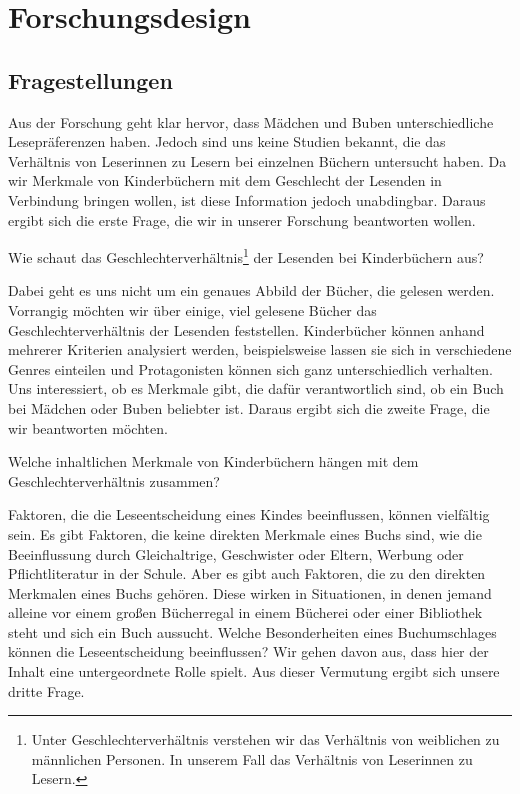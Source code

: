 \chapter{Forschungsdesign}

\section{Fragestellungen}

Aus der Forschung geht klar hervor, dass Mädchen und Buben
unterschiedliche Lesepräferenzen haben. Jedoch sind uns keine Studien
bekannt, die das Verhältnis von Leserinnen zu Lesern bei einzelnen
Büchern untersucht haben. Da wir Merkmale von Kinderbüchern mit dem
Geschlecht der Lesenden in Verbindung bringen wollen, ist diese
Information jedoch unabdingbar. Daraus ergibt sich die erste Frage, die
wir in unserer Forschung beantworten wollen.

\begin{frage}\label{fra:andere} Wie schaut das Geschlechterverhältnis\footnote{Unter Geschlechterverhältnis verstehen wir das Verhältnis von weiblichen zu männlichen Personen. In unserem Fall das Verhältnis von Leserinnen zu Lesern.} der Lesenden bei Kinderbüchern aus? \end{frage}

Dabei geht es uns nicht um ein genaues Abbild der Bücher, die gelesen
werden. Vorrangig möchten wir über einige, viel gelesene Bücher das
Geschlechterverhältnis der Lesenden feststellen. Kinderbücher können
anhand mehrerer Kriterien analysiert werden, beispielsweise lassen sie
sich in verschiedene Genres einteilen und Protagonisten können sich ganz
unterschiedlich verhalten. Uns interessiert, ob es Merkmale gibt, die
dafür verantwortlich sind, ob ein Buch bei Mädchen oder Buben beliebter
ist. Daraus ergibt sich die zweite Frage, die wir beantworten möchten.

\begin{frage}\label{fra:unterschiede} Welche inhaltlichen Merkmale von Kinderbüchern hängen mit dem Geschlechterverhältnis zusammen? \end{frage}

Faktoren, die die Leseentscheidung eines Kindes beeinflussen, können
vielfältig sein. Es gibt Faktoren, die keine direkten Merkmale eines
Buchs sind, wie \zB die Beeinflussung durch Gleichaltrige, Geschwister
oder Eltern, Werbung oder Pflichtliteratur in der Schule. Aber es gibt
auch Faktoren, die zu den direkten Merkmalen eines Buchs gehören. Diese
wirken in Situationen, in denen jemand alleine vor einem großen
Bücherregal in einem Bücherei oder einer Bibliothek steht und sich ein
Buch aussucht. Welche Besonderheiten eines Buchumschlages können die
Leseentscheidung beeinflussen? Wir gehen davon aus, dass hier der Inhalt
eine untergeordnete Rolle spielt. Aus dieser Vermutung ergibt sich
unsere dritte Frage.

